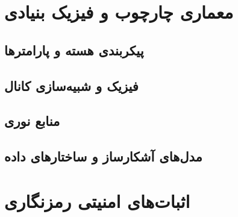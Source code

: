 \documentclass[11pt, a4paper, oneside]{book}
\title{\lr{\textbf{Comprehensive Documentation\\ of QKD Simulation Framework}}}
\author{\lr{\textbf{Reza Aramjou}}}
\date{\today}
\begin{document}
	
	\maketitle
	\frontmatter
	
	
	
	\tableofcontents
	\listoftables
	\lstlistoflistings
	\newpage
	
	\mainmatter
	\part{معماری چارچوب و فیزیک بنیادی}
	
	
	\chapter{پیکربندی هسته و پارامترها}
	\label{ch:params}
	
	
	\chapter{فیزیک و شبیه‌سازی کانال}
	\label{ch:physics}
	
	
	\chapter{منابع نوری}
	\label{ch:sources}
	
	
	\chapter{مدل‌های آشکارساز و ساختارهای داده}
	\label{ch:detectors}
	
	
	\part{اثبات‌های امنیتی رمزنگاری}
	
\end{document}

